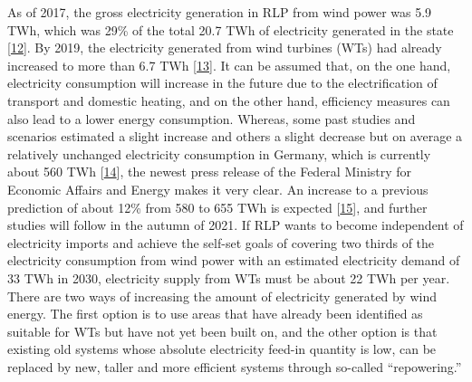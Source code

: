 \documentclass[a4paper,11pt]{article}
\begin{document}
As of 2017, the gross electricity generation in RLP from wind power was 5.9 TWh, which was 29\% of the total 20.7 TWh of electricity generated in the state {[}\protect\hyperlink{ref-Lehnert.2020}{12}{]}. By 2019, the electricity generated from wind turbines (WTs) had already increased to more than 6.7 TWh {[}\protect\hyperlink{ref-AmprionGmbH.2019}{13}{]}. It can be assumed that, on the one hand, electricity consumption will increase in the future due to the electrification of transport and domestic heating, and on the other hand, efficiency measures can also lead to a lower energy consumption. Whereas, some past studies and scenarios estimated a slight increase and others a slight decrease but on average a relatively unchanged electricity consumption in Germany, which is currently about 560 TWh {[}\protect\hyperlink{ref-NormanGerhardt.2015}{14}{]}, the newest press release of the Federal Ministry for Economic Affairs and Energy makes it very clear. An increase to a previous prediction of about 12\% from 580 to 655 TWh is expected {[}\protect\hyperlink{ref-AndreasMertens.13.07.2021}{15}{]}, and further studies will follow in the autumn of 2021. If RLP wants to become independent of electricity imports and achieve the self-set goals of covering two thirds of the electricity consumption from wind power with an estimated electricity demand of 33 TWh in 2030, electricity supply from WTs must be about 22 TWh per year. There are two ways of increasing the amount of electricity generated by wind energy. The first option is to use areas that have already been identified as suitable for WTs but have not yet been built on, and the other option is that existing old systems whose absolute electricity feed-in quantity is low, can be replaced by new, taller and more efficient systems through so-called ``repowering.''

\newpage
\end{document}

